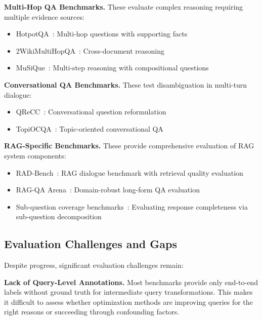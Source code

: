 \documentclass{article}
\begin{document}
\textbf{Multi-Hop QA Benchmarks.} These evaluate complex reasoning requiring multiple evidence sources:
\begin{itemize}[leftmargin=*,nosep]
    \item HotpotQA~\citep{DBLP:conf/emnlp/Yang0ZBCSM18}: Multi-hop questions with supporting facts
    \item 2WikiMultiHopQA~\citep{DBLP:conf/coling/HoNSA20}: Cross-document reasoning
    \item MuSiQue~\citep{DBLP:journals/tacl/TrivediBKS22}: Multi-step reasoning with compositional questions
\end{itemize}

\textbf{Conversational QA Benchmarks.} These test disambiguation in multi-turn dialogue:
\begin{itemize}[leftmargin=*,nosep]
    \item QReCC~\citep{DBLP:conf/naacl/AnanthaRTSCC21}: Conversational question reformulation
    \item TopiOCQA~\citep{DBLP:journals/tacl/AdlakhaSKCR22}: Topic-oriented conversational QA
\end{itemize}

\textbf{RAG-Specific Benchmarks.} These provide comprehensive evaluation of RAG system components:
\begin{itemize}[leftmargin=*,nosep]
    \item RAD-Bench~\citep{rag_benchmark_1}: RAG dialogue benchmark with retrieval quality evaluation
    \item RAG-QA Arena~\citep{rag_benchmark_3}: Domain-robust long-form QA evaluation
    \item Sub-question coverage benchmarks~\citep{rag_benchmark_2}: Evaluating response completeness via sub-question decomposition
\end{itemize}

\subsection{Evaluation Challenges and Gaps}

Despite progress, significant evaluation challenges remain:

\textbf{Lack of Query-Level Annotations.} Most benchmarks provide only end-to-end labels without ground truth for intermediate query transformations. This makes it difficult to assess whether optimization methods are improving queries for the right reasons or succeeding through confounding factors.
\end{document}
